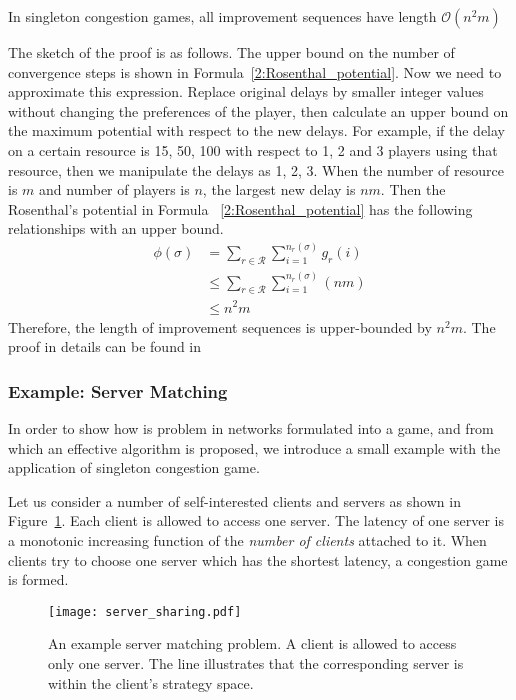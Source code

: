\begin{theorem}
\label{background:polynomialConvergence}
In singleton congestion games, all improvement sequences have length $\mathcal{O}(n^2m)$~\cite{aaai_IeongMNSS05}
\end{theorem}

The sketch of the proof is as follows.
The upper bound on the number of convergence steps is shown in Formula~\ref{2:Rosenthal_potential}.
Now we need to approximate this expression.
Replace original delays by smaller integer values without changing the preferences of the player, then calculate an upper bound on the maximum potential with respect to the new delays.
For example, if the delay on a certain resource is 15, 50, 100 with respect to 1, 2 and 3 players using that resource, then we manipulate the delays as 1, 2, 3.
When the number of resource is $m$ and number of players is $n$, the largest new delay is $nm$.
Then the Rosenthal's potential in Formula ~\ref{2:Rosenthal_potential} has the following relationships with an upper bound.
\begin{equation}
\label{2:Rosenthal_potential_newdelay}
\begin{split}
\phi(\sigma) 
& =\sum\limits^{}_{r\in \mathcal{R}} \sum\limits^{n_r(\sigma)}_{i=1} g_r(i)\\
& \leq \sum\limits^{}_{r\in \mathcal{R}} \sum\limits^{n_r(\sigma)}_{i=1} (nm)\\
& \leq n^2m
\end{split}
\end{equation}
Therefore, the length of improvement sequences is upper-bounded by $n^2m$.
The proof in details can be found in ~\cite{aaai_IeongMNSS05, LectureA}


\subsubsection{Example: Server Matching}
In order to show how is problem in networks formulated into a game, and from which an effective algorithm is proposed, we introduce a small example with the application of singleton congestion game.

Let us consider a number of self-interested clients and servers as shown in Figure~\ref{server_sharing}.
Each client is allowed to access one server.
The latency of one server is a monotonic increasing function of the \textit{number of clients} attached to it.
When clients try to choose one server which has the shortest latency, a congestion game is formed.
\begin{figure}[h!]
  \centering
  \texttt{[image: server\_sharing.pdf]}
  \caption{An example server matching problem. A client is allowed to access only one server. The line illustrates that the corresponding server is within the client's strategy space.}
\label{server_sharing}
\end{figure}

